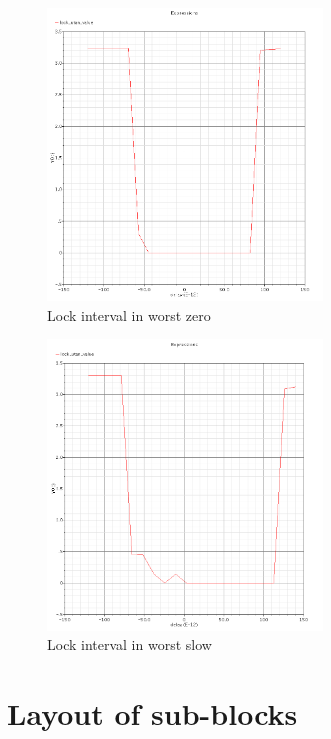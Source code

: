 \documentclass[a4paper,12pt]{article} \usepackage{graphicx}
\begin{document}
\begin{figure}[h]
  \centering
  \includegraphics[width=0.65\textwidth]{../Bilder/LD_tran/LD_lsim_wz.png}
  \caption{Lock interval in worst zero}
  \label{fig:LDwz}
\end{figure}

\begin{figure}[h]
  \centering
  \includegraphics[width=0.65\textwidth]{../Bilder/LD_tran/LD_lsim_ws.png}
  \caption{Lock interval in worst slow}
  \label{fig:LDws}
\end{figure}

\section{Layout of sub-blocks}
\label{sec:Layout}
\end{document}
